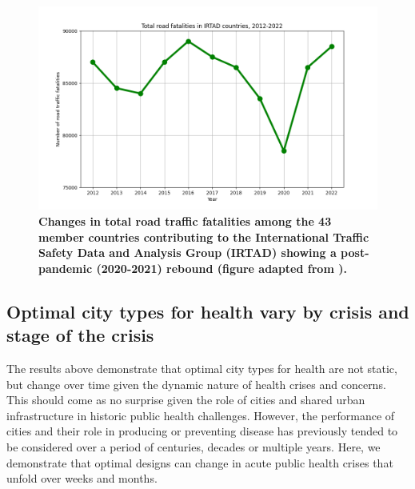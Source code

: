\documentclass[preprint,10pt]{elsarticle} %
\begin{document}
\begin{figure}
\centering

\includegraphics[trim={0 0 0 0},clip,scale=0.5]{Images/Recreated.png}
\caption{\bf Changes in total road traffic fatalities among the 43 member countries contributing to the International Traffic Safety Data and Analysis Group (IRTAD) showing a post-pandemic (2020-2021) rebound (figure adapted from \cite{ITFRS2023}).}  
 \label{fig:GBD}
\end{figure}



\subsection*{Optimal city types for health vary by crisis and stage of the crisis}

The results above demonstrate that optimal city types for health are not static, but change over time given the dynamic nature of health crises and concerns. This should come as no surprise given the role of cities and shared urban infrastructure in historic public health challenges. However, the performance of cities and their role in producing or preventing disease has previously tended to be considered over a period of centuries, decades or multiple years. Here, we demonstrate that optimal designs can change in acute public health crises that unfold over weeks and months.
\end{document}

